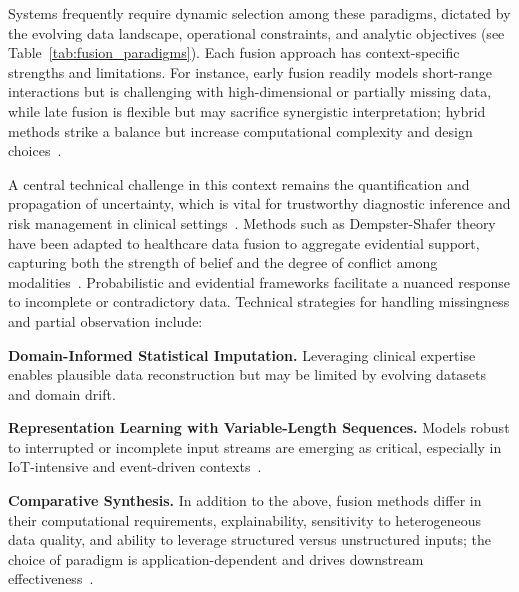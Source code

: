 \documentclass[sigconf]{acmart}
\begin{document}
Systems frequently require dynamic selection among these paradigms, dictated by the evolving data landscape, operational constraints, and analytic objectives (see Table~\ref{tab:fusion_paradigms}). Each fusion approach has context-specific strengths and limitations. For instance, early fusion readily models short-range interactions but is challenging with high-dimensional or partially missing data, while late fusion is flexible but may sacrifice synergistic interpretation; hybrid methods strike a balance but increase computational complexity and design choices~\cite{ref41,ref42,ref77,ref84,ref90}.

A central technical challenge in this context remains the quantification and propagation of uncertainty, which is vital for trustworthy diagnostic inference and risk management in clinical settings~\cite{ref70,ref73,ref46,ref50}. Methods such as Dempster-Shafer theory have been adapted to healthcare data fusion to aggregate evidential support, capturing both the strength of belief and the degree of conflict among modalities~\cite{ref73}. Probabilistic and evidential frameworks facilitate a nuanced response to incomplete or contradictory data. Technical strategies for handling missingness and partial observation include:

\textbf{Domain-Informed Statistical Imputation.} Leveraging clinical expertise enables plausible data reconstruction but may be limited by evolving datasets and domain drift.

\textbf{Representation Learning with Variable-Length Sequences.} Models robust to interrupted or incomplete input streams are emerging as critical, especially in IoT-intensive and event-driven contexts~\cite{ref76,ref77,ref84,ref89,ref90}.

\textbf{Comparative Synthesis.} In addition to the above, fusion methods differ in their computational requirements, explainability, sensitivity to heterogeneous data quality, and ability to leverage structured versus unstructured inputs; the choice of paradigm is application-dependent and drives downstream effectiveness~\cite{ref70,ref50,ref54,ref84}.
\end{document}
